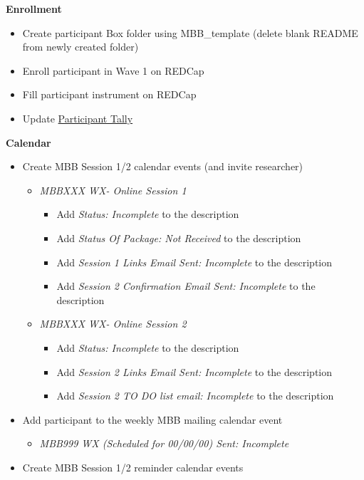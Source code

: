 \documentclass[]{book}
\providecommand{\tightlist}{%
  \setlength{\itemsep}{0pt}\setlength{\parskip}{0pt}}
\begin{document}
\textbf{Enrollment}

\begin{itemize}
\tightlist
\item
  Create participant Box folder using MBB\_template (delete blank README from newly created folder)
\item
  Enroll participant in Wave 1 on REDCap
\item
  Fill participant instrument on REDCap
\item
  Update \href{https://ucla.app.box.com/file/724688028024}{Participant Tally}
\end{itemize}

\textbf{Calendar}

\begin{itemize}
\tightlist
\item
  Create MBB Session 1/2 calendar events (and invite researcher)

  \begin{itemize}
  \tightlist
  \item
    \emph{MBBXXX WX- Online Session 1}

    \begin{itemize}
    \tightlist
    \item
      Add \emph{Status: Incomplete} to the description
    \item
      Add \emph{Status Of Package: Not Received} to the description
    \item
      Add \emph{Session 1 Links Email Sent: Incomplete} to the description
    \item
      Add \emph{Session 2 Confirmation Email Sent: Incomplete} to the description
    \end{itemize}
  \item
    \emph{MBBXXX WX- Online Session 2}

    \begin{itemize}
    \tightlist
    \item
      Add \emph{Status: Incomplete} to the description
    \item
      Add \emph{Session 2 Links Email Sent: Incomplete} to the description
    \item
      Add \emph{Session 2 TO DO list email: Incomplete} to the description
    \end{itemize}
  \end{itemize}
\item
  Add participant to the weekly MBB mailing calendar event

  \begin{itemize}
  \tightlist
  \item
    \emph{MBB999 WX (Scheduled for 00/00/00) Sent: Incomplete}
  \end{itemize}
\item
  Create MBB Session 1/2 reminder calendar events


\end{itemize}
\end{document}
